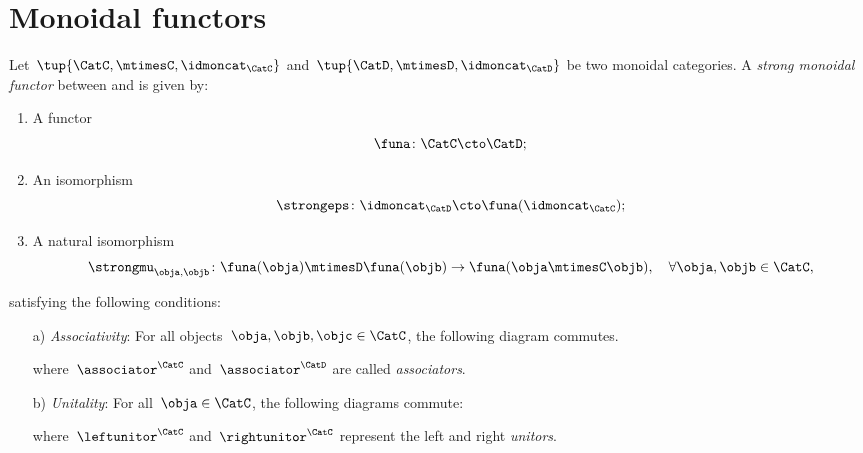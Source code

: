 

\section{Monoidal functors}
\label{sec:monoidal-functors}
\begin{ctdefinition}
  \label{def:strong-monoidal-functor}

  Let~$\tup{\CatC,\mtimesC,\idmoncat_{\CatC}}$ and~$\tup{\CatD,\mtimesD,\idmoncat_{\CatD}}$ be two monoidal categories. A \emph{strong monoidal functor} between \CatC and \CatD is given by:
  \begin{enumerate}
    \item A functor
    \begin{equation}
      \funa \colon \CatC \cto \CatD;
    \end{equation}
    \item An isomorphism
    \begin{equation}
      \strongeps\colon \idmoncat_{\CatD}\cto \funa(\idmoncat_{\CatC});
    \end{equation}
    \item A natural isomorphism
    \begin{equation}
      \strongmu_{\obja,\objb}\colon \funa(\obja)\mtimesD \funa(\objb) \to \funa(\obja \mtimesC \objb),\quad \forall \obja,\objb\in \CatC,
    \end{equation}
  \end{enumerate}
  satisfying the following conditions:
  \begin{enumerate}
    \item[a)] \emph{Associativity}: For all objects~$\obja,\objb,\objc\in \CatC$, the following diagram commutes.
    \begin{center}
    \end{center}
    where~$\associator^\CatC$ and~$\associator^\CatD$ are called \emph{associators}.
    \item[b)] \emph{Unitality}: For all~$\obja\in \CatC$, the following diagrams commute:
    \begin{center}
    \end{center}
    where~$\leftunitor^\CatC$ and~$\rightunitor^\CatC$ represent the left and right \emph{unitors}.
  \end{enumerate}
\end{ctdefinition}


